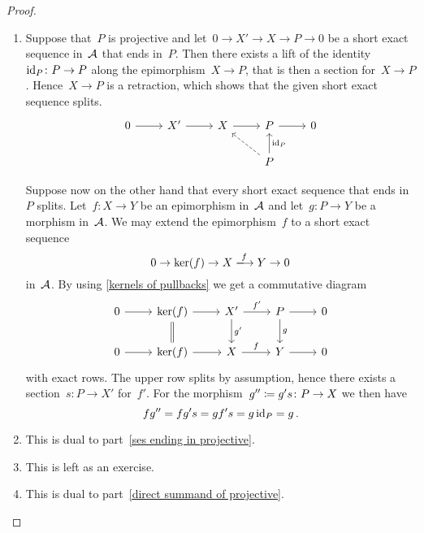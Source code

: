\begin{proof}
  \leavevmode
  \begin{enumerate}
    \item
      Suppose that~$P$ is projective and let~$0 \to X' \to X \to P \to 0$ be a short exact sequence in~$\mathcal{A}$ that ends in~$P$.
      Then there exists a lift of the identity~$\operatorname{id}_P \colon P \to P$ along the epimorphism~$X \to P$, that is then a section for~$X \to P$.
      Hence~$X \to P$ is a retraction, which shows that the given short exact sequence splits.
      \[
        \begin{tikzcd}
            0
            \arrow{r}
          & X'
            \arrow{r}
          & X
            \arrow{r}
          & P
            \arrow{r}
          & 0
          \\
            {}
          & {}
          & {}
          & P
            \arrow{u}[right]{\id_P}
            \arrow[dashed]{ul}
          & {}
        \end{tikzcd}
      \]
      
      Suppose now on the other hand that every short exact sequence that ends in~$P$ splits.
      Let~$f \colon X \to Y$ be an epimorphism in~$\mathcal{A}$ and let~$g \colon P \to Y$ be a morphism in~$\mathcal{A}$.
      We may extend the epimorphism~$f$ to a short exact sequence
      \[
        0
        \to
        \ker(f)
        \to
        X
        \xlongto{f}
        Y
        \to
        0
      \]
      in~$\mathcal{A}$.
      By using \cref{kernels of pullbacks} we get a commutative diagram
      \[
        \begin{tikzcd}
            0
            \arrow{r}
          & \ker(f)
            \arrow{r}
            \arrow[equal]{d}
          & X'
            \arrow{r}[above]{f'}
            \arrow{d}[right]{g'}
          & P
            \arrow{r}
            \arrow{d}[right]{g}
          & 0
          \\
            0
            \arrow{r}
          & \ker(f)
            \arrow{r}
          & X
            \arrow{r}[above]{f}
          & Y
            \arrow{r}
          & 0
        \end{tikzcd}
      \]
      with exact rows.
      The upper row splits by assumption, hence there exists a section~$s \colon P \to X'$ for~$f'$.
      For the morphism~$g'' \coloneqq g's \colon P \to X$ we then have
      \[
          f g''
        = f g' s
        = g f' s
        = g \operatorname{id}_P
        = g \,.
      \]
    \item
      This is dual to part~\ref*{ses ending in projective}.
    \item
      This is left as an exercise.
    \item
      This is dual to part~\ref*{direct summand of projective}.
    \qedhere
  \end{enumerate}
\end{proof}


